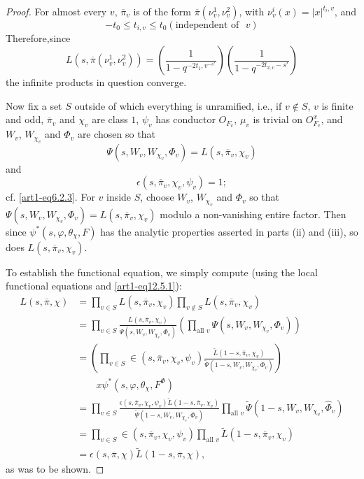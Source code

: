 \begin{proof}
For almost every $v$, $\overline{\pi}_{v}$ is of the form $\overline{\pi}(\nu^{1}_{v},\nu^{2}_{v})$, with $\nu^{i}_{v}(x)=|x|^{t_{i},v}$, and
$$
-t_{0}\leq t_{i,v}\leq t_{0}(\text{independent of~ } v)
$$
Therefore,\pageoriginale since
$$
L(s,\overline{\pi}(\nu^{1}_{v},\nu^{2}_{v}))=\left(\dfrac{1}{1-q^{-2t_{1},v^{-s'}}}\right)\left(\dfrac{1}{1-q^{-2t_{2,v}-s'}}\right)
$$
the infinite products in question converge.

Now fix a set $S$ outside of which everything is unramified, i.e., if $v\not\in S$, $v$ is finite and odd, $\overline{\pi}_{v}$ and $\chi_{v}$ are class $1$, $\psi_{v}$ has conductor $O_{F_{v}}$, $\mu_{v}$ is trivial on $O^{x}_{F_{v}}$, and $W_{v}$, $W_{\chi_{v}}$ and $\Phi_{v}$ are chosen so that
$$
\Psi(s,W_{v},W_{\chi_{v}},\Phi_{v})=L(s,\overline{\pi}_{v},\chi_{v})
$$
and
$$
\epsilon(s,\overline{\pi}_{v},\chi_{v},\psi_{v})=1;
$$
cf. \eqref{art1-eq6.2.3}. For $v$ inside $S$, choose $W_{v}$, $W_{\chi_{v}}$ and $\Phi_{v}$ so that $\Psi(s,W_{v},W_{\chi_{v}},\Phi_{v})=L(s,\overline{\pi}_{v},\chi_{v})$ modulo a non-vanishing entire factor. Then since $\psi^{*}(s,\varphi,\theta_{\chi},F)$ has the analytic properties asserted in parts (ii) and (iii), so does $L(s,\overline{\pi}_{v},\chi_{v})$.

To establish the functional equation, we simply compute (using the local functional equations and \eqref{art1-eq12.5.1}):
\begin{align*}
L(s,\overline{\pi},\chi) &= \prod\limits_{v\in S}L(s,\overline{\pi}_{v},\chi_{v})\prod\limits_{v\not\in S}L(s,\overline{\pi}_{v},\chi_{v})\\[4pt]
&= \prod\limits_{v\in S} \frac{L(s,\overline{\pi}_{v},\chi_{v})}{\Psi(s,W_{v},W_{\chi_{v}},\Phi_{v})}\left(\prod\limits_{\text{all~} v}\Psi(s,W_{v},W_{\chi_{v}},\Phi_{v})\right)\\[4pt]
&= \left(\prod\limits_{v\in S}\in (s,\overline{\pi}_{v},\chi_{v},\psi_{v})\frac{\widetilde{L}(1-s,\overline{\pi}_{v},\chi_{v})}{\widetilde{\Psi}(1-s,W_{v},W_{\chi_{v}},\Phi_{v})}\right)\\[4pt]
&\qquad x\psi^{*}(s,\varphi,\theta_{\chi},F^{\Phi})\\[4pt]
&=\prod\limits_{v\in S}\frac{\epsilon(s,\overline{\pi}_{v},\chi_{v},\psi_{v})\widetilde{L}(1-s,\overline{\pi}_{v},\chi_{v})}{\widetilde{\Psi}(1-s,W_{v},W_{\chi_{v}},\Phi_{v})}\prod\limits_{\text{all~}v}\widetilde{\Psi}(1-s,W_{v},W_{\chi_{v}},\widehat{\Phi}_{v})\\[4pt]
&= \prod\limits_{v\in S}\in(s,\overline{\pi}_{v},\chi_{v},\psi_{v})\prod\limits_{\text{all~}v}\widetilde{L}(1-s,\overline{\pi}_{v},\chi_{v})\\[4pt]
&= \epsilon(s,\overline{\pi},\chi)\widetilde{L}(1-s,\overline{\pi},\chi),
\end{align*}
as was to be shown.
\end{proof}

